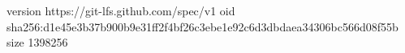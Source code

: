 version https://git-lfs.github.com/spec/v1
oid sha256:d1e45e3b37b900b9e31ff2f4bf26c3ebe1e92c6d3dbdaea34306bc566d08f55b
size 1398256
